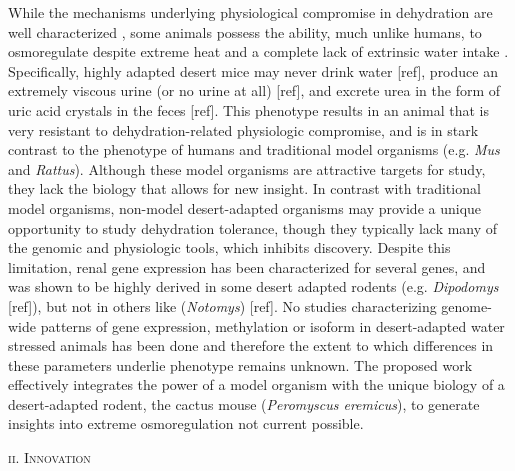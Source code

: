 \documentclass[11pt]{article}
\begin{document}
While the mechanisms underlying physiological compromise in dehydration are well characterized \citep{Roberts:2010fl}, some animals possess the ability, much unlike humans, to osmoregulate despite extreme heat and a complete lack of extrinsic water intake \cite{NAGY:1994ta}. Specifically, highly adapted desert mice may never drink water [ref], produce an extremely viscous urine (or no urine at all) [ref], and excrete urea in the form of uric acid crystals in the feces [ref]. This phenotype results in an animal that is very resistant to dehydration-related physiologic compromise, and is in stark contrast to the phenotype of humans and traditional model organisms (e.g. \textit{Mus} and \textit{Rattus}). Although these model organisms are attractive targets for study, they lack the biology that allows for new insight. In contrast with traditional model organisms, non-model desert-adapted organisms may provide a unique opportunity to study dehydration tolerance, though they typically lack many of the genomic and physiologic tools, which inhibits discovery. Despite this limitation, renal gene expression has been characterized for several genes, and was shown to be highly derived in some desert adapted rodents (e.g. \textit{Dipodomys} [ref]), but not in others like (\textit{Notomys}) [ref]. No studies characterizing genome-wide patterns of gene expression, methylation or isoform in desert-adapted water stressed animals has been done and therefore the extent to which differences in these parameters underlie phenotype remains unknown. The proposed work effectively integrates the power of a model organism with the unique biology of a desert-adapted rodent, the cactus mouse (\textit{Peromyscus eremicus}), to generate insights into extreme osmoregulation not current possible.
\normalsize 
\begin{center}
\textsc{{ii. Innovation}} \\
\end{center}
\end{document}
